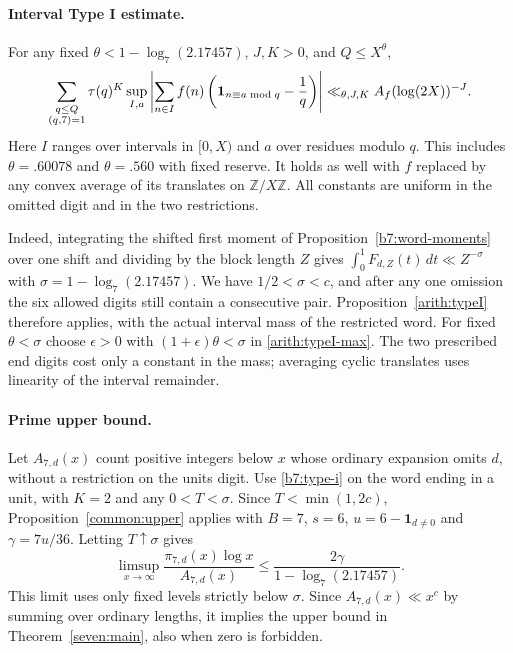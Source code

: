 \documentclass[11pt,a4paper]{article}
\theoremstyle{paperplain}
\numberwithin{equation}{section}
\begin{document}
\paragraph{Interval Type I estimate.}
For any fixed $\theta<1-\log_7(2.17457)$, $J,K>0$, and $Q\le X^\theta$,
\begin{equation}
 \sum_{\substack{q\le Q\\(q,7)=1}}\tau(q)^K
 \sup_{I,a}\left|\sum_{n\in I} f(n)
       \left({\bf1}_{n\equiv a\bmod q}-\frac1q\right)\right|
 \ll_{\theta,J,K} A_f(\log(2X))^{-J}.
 \label{b7:type-i}
\end{equation}
Here $I$ ranges over intervals in $[0,X)$ and $a$ over residues modulo $q$.
This includes $\theta=.60078$ and $\theta=.560$ with fixed reserve. It holds as well with
$f$ replaced by any convex average of its translates on $\mathbb Z/X\mathbb Z$.
All constants are uniform in the omitted digit and in the two restrictions.

Indeed, integrating the shifted first moment of Proposition~\ref{b7:word-moments}
over one shift and dividing by the block length $Z$ gives
$\int_0^1 F_{d,Z}(t)\,dt\ll Z^{-\sigma}$ with
$\sigma=1-\log_7(2.17457)$. We have $1/2<\sigma<c$, and after any one
omission the six allowed digits still contain a consecutive pair.
Proposition~\ref{arith:typeI} therefore applies, with the actual
interval mass of the restricted word. For fixed $\theta<\sigma$ choose
$\epsilon>0$ with $(1+\epsilon)\theta<\sigma$ in \eqref{arith:typeI-max}.
The two prescribed end digits cost only a constant in the mass; averaging
cyclic translates uses linearity of the interval remainder.

\paragraph{Prime upper bound.}
Let $A_{7,d}(x)$ count positive integers below $x$ whose ordinary
expansion omits $d$, without a restriction on the units digit. Use
\eqref{b7:type-i} on the word ending in a unit, with $K=2$ and any
$0<T<\sigma$. Since $T<\min(1,2c)$, Proposition~\ref{common:upper}
applies with $B=7$, $s=6$, $u=6-\mathbf1_{d\ne0}$ and
$\gamma=7u/36$. Letting $T\uparrow\sigma$ gives
\[
 \limsup_{x\to\infty}\frac{\pi_{7,d}(x)\log x}{A_{7,d}(x)}
 \le \frac{2\gamma}{1-\log_7(2.17457)}.
\]
This limit uses only fixed levels strictly below $\sigma$. Since
$A_{7,d}(x)\ll x^c$ by summing over ordinary lengths, it implies the
upper bound in Theorem~\ref{seven:main}, also when zero is forbidden.
\end{document}

